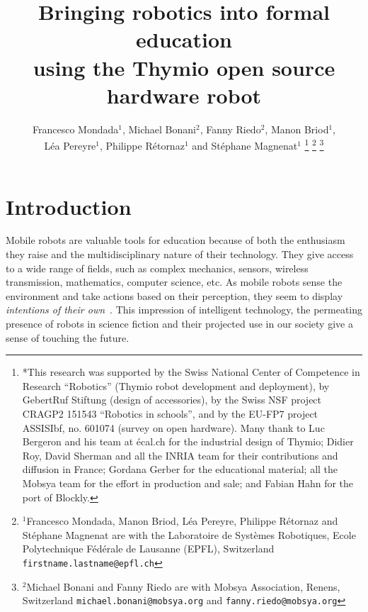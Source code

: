 \documentclass[letterpaper, 10 pt, conference]{ieeeconf}  %
\title{\LARGE \bf
Bringing robotics into formal education \\
using the Thymio open source hardware robot
}
\author{Francesco Mondada$^{1}$, Michael Bonani$^{2}$, Fanny Riedo$^{2}$, Manon Briod$^{1}$, \\
L\'ea Pereyre$^{1}$, Philippe R\'etornaz$^{1}$ and St\'ephane Magnenat$^{1}$%
\thanks{*This research was supported by the Swiss National Center of Competence in Research ``Robotics'' (Thymio robot development and deployment), by GebertRuf Stiftung (design of accessories), by the Swiss NSF project CRAGP2 151543 ``Robotics in schools'', and by the EU-FP7 project ASSISIbf, no. 601074 (survey on open hardware).
Many thank to Luc Bergeron and his team at \'ecal.ch for the industrial design of Thymio; Didier Roy, David Sherman and all the INRIA team for their contributions and diffusion in France; Gordana Gerber for the educational material; all the Mobsya team for the effort in production and sale; and Fabian Hahn for the port of Blockly.}%
\thanks{$^{1}$Francesco Mondada, Manon Briod, L\'ea Pereyre, Philippe R\'etornaz and St\'ephane Magnenat are with the Laboratoire de Syst\`emes Robotiques,
        Ecole Polytechnique F\'ed\'erale de Lausanne (EPFL), Switzerland
        {\tt\small firstname.lastname@epfl.ch}}%
\thanks{$^{2}$Michael Bonani and Fanny Riedo are with Mobsya Association, Renens, Switzerland
        {\tt\small michael.bonani@mobsya.org} and {\tt\small fanny.riedo@mobsya.org}}%
}
\begin{document}
\maketitle
\thispagestyle{empty}
\pagestyle{empty}





\section{Introduction}

Mobile robots are valuable tools for education because of both the enthusiasm they raise and the multidisciplinary nature of their technology.
They give access to a wide range of fields, such as complex mechanics, sensors, wireless transmission, mathematics, computer science, etc.
As mobile robots sense the environment and take actions based on their perception, they seem to display \emph{intentions of their own}~\cite{Mondada2001}.
This impression of intelligent technology, the permeating presence of robots in science fiction and their projected use in our society give a sense of touching the future.
\end{document}

